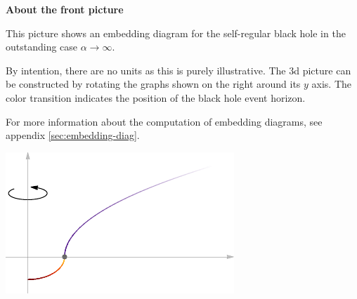 \documentclass[12pt,a4paper]{report}
\numberwithin{equation}{chapter}
\begin{document}
\noindent
{\bf About the front picture} \\

\noindent
\begin{minipage}{0.6\textwidth}
This picture shows an embedding diagram for the self-regular black hole in the outstanding case $\alpha\to\infty$.

By intention, there are no units as this is purely illustrative. The 3d picture can be constructed by rotating the graphs shown on the right around its $y$ axis. The color transition indicates
the position of the black hole event horizon.

For more information about the computation of embedding diagrams, see appendix \ref{sec:embedding-diag}.

%
\end{minipage}%
\hspace{.3cm}
\begin{minipage}{0.4\textwidth}
\includegraphics[scale=1]{figures/titlepage-explain.pdf}
\end{minipage}
%
%
\end{document}
